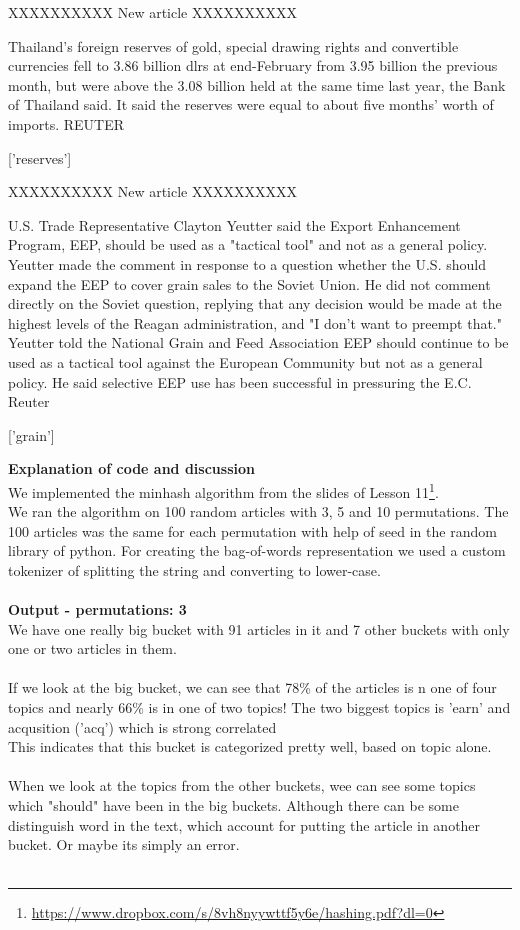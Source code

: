 \documentclass{article}
\begin{document}
\begin{pythonOutput}
['acq']

XXXXXXXXXX
New article
XXXXXXXXXX

Thailand's foreign reserves of gold,
special drawing rights and convertible currencies fell to 3.86
billion dlrs at end-February from 3.95 billion the previous
month, but were above the 3.08 billion held at the same time
last year, the Bank of Thailand said.
    It said the reserves were equal to about five months' worth
of imports.
 REUTER

['reserves']

XXXXXXXXXX
New article
XXXXXXXXXX

U.S. Trade Representative Clayton
Yeutter said the Export Enhancement Program, EEP, should be
used as a "tactical tool" and not as a general policy.
    Yeutter made the comment in response to a question whether
the U.S. should expand the EEP to cover grain sales to the
Soviet Union.
    He did not comment directly on the Soviet question,
replying that any decision would be made at the highest levels
of the Reagan administration, and "I don't want to preempt that."
    Yeutter told the National Grain and Feed Association EEP
should continue to be used as a tactical tool against the
European Community but not as a general policy. He said
selective EEP use has been successful in pressuring the E.C.
 Reuter

['grain']


\end{pythonOutput}
\textbf{Explanation of code and discussion}\\
We implemented the minhash algorithm from the slides of Lesson 11\footnote{\url{https://www.dropbox.com/s/8vh8nyywttf5y6e/hashing.pdf?dl=0}}.\\
We ran the algorithm on 100 random articles with 3, 5 and 10 permutations. The 100 articles was the same for each permutation with help of seed in the random library of python. For creating the bag-of-words representation we used a custom tokenizer of splitting the string and converting to lower-case.\\
~\\
\textbf{Output - permutations: 3}\\
We have one really big bucket with 91 articles in it and 7 other buckets with only one or two articles in them.\\
~\\
If we look at the big bucket, we can see that 78\% of the articles is n one of four topics and nearly 66\% is in one of two topics! The two biggest topics is 'earn' and acqusition ('acq') which is strong correlated~\\
This indicates that this bucket is categorized pretty well, based on topic alone. \\
~\\
When we look at the topics from the other buckets, wee can see some topics which "should" have been in the big buckets. Although there can be some distinguish word in the text, which account for putting the article in another bucket. Or maybe its simply an error. \\
~\\
\end{document}
